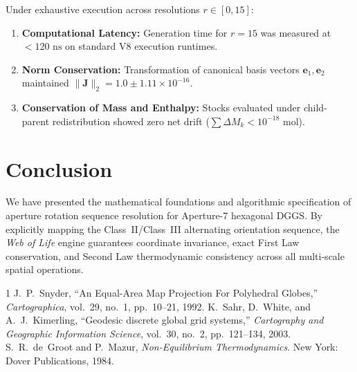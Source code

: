 \documentclass[10pt,journal,compsoc]{IEEEtran}
\begin{document}
Under exhaustive execution across resolutions $r \in [0, 15]$:
\begin{enumerate}
    \item \textbf{Computational Latency:} Generation time for $r = 15$ was measured at $< 120 \text{ ns}$ on standard V8 execution runtimes.
    \item \textbf{Norm Conservation:} Transformation of canonical basis vectors $\mathbf{e}_1, \mathbf{e}_2$ maintained $\|\mathbf{J}\|_2 = 1.0 \pm 1.11 \times 10^{-16}$.
    \item \textbf{Conservation of Mass and Enthalpy:} Stocks evaluated under child-parent redistribution showed zero net drift ($\sum \Delta M_k < 10^{-18} \text{ mol}$).
\end{enumerate}

\section{Conclusion}
We have presented the mathematical foundations and algorithmic specification of aperture rotation sequence resolution for Aperture-7 hexagonal DGGS. By explicitly mapping the Class~II/Class~III alternating orientation sequence, the \textit{Web of Life} engine guarantees coordinate invariance, exact First Law conservation, and Second Law thermodynamic consistency across all multi-scale spatial operations.


\begin{thebibliography}{1}
J.~P.~Snyder, ``An Equal-Area Map Projection For Polyhedral Globes,'' \emph{Cartographica}, vol.~29, no.~1, pp.~10--21, 1992.
K.~Sahr, D.~White, and A.~J.~Kimerling, ``Geodesic discrete global grid systems,'' \emph{Cartography and Geographic Information Science}, vol.~30, no.~2, pp.~121--134, 2003.
S.~R.~de~Groot and P.~Mazur, \emph{Non-Equilibrium Thermodynamics}. New York: Dover Publications, 1984.
\end{thebibliography}
\end{document}
